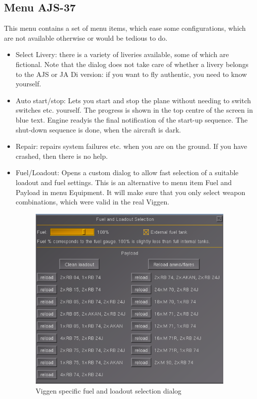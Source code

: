 \documentclass[a4paper]{report}
\begin{document}
\subsection{Menu AJS-37}
This menu contains a set of menu items, which ease some configurations, which are not available otherwise or would be tedious to do.
\begin{itemize}
\item Select Livery: there is a variety of liveries available, some of which are fictional. Note that the dialog does not take care of whether a livery belongs to the AJS or JA Di version: if you want to fly authentic, you need to know yourself.
\item Auto start/stop: Lets you start and stop the plane without needing to switch switches etc. yourself. The progress is shown in the top centre of the screen in blue text. \glqq Engine ready\grqq is the final notification of the start-up sequence. The shut-down sequence is done, when the aircraft is dark.
\item Repair: repairs system failures etc. when you are on the ground. If you have crashed, then there is no help.
\item Fuel/Loadout: Opens a custom dialog to allow fast selection of a suitable loadout and fuel settings. This is an alternative to menu item Fuel and Payload in menu Equipment. It will make sure that you only select weapon combinations, which were valid in the real Viggen.

\begin{figure}[h]
\centering
 \includegraphics[width=10cm]{images/fg_loadout_dialog.png}
 \caption{Viggen specific fuel and loadout selection dialog}
\end{figure}


\end{itemize}
\end{document}
